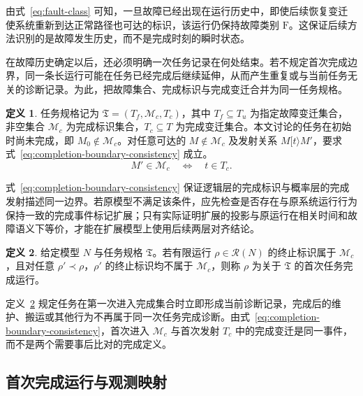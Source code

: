 \documentclass[master,fontset=ubuntu]{shnuthesis}
\theoremstyle{definition}
\newtheorem{thesisdefinition}{定义}
\begin{document}
由式~\eqref{eq:fault-class} 可知，一旦故障已经出现在运行历史中，即使后续恢复变迁使系统重新到达正常路径也可达的标识，该运行仍保持故障类别 \(\mathrm F\)。这保证后续方法识别的是故障发生历史，而不是完成时刻的瞬时状态。

在故障历史确定以后，还必须明确一次任务记录在何处结束。若不规定首次完成边界，同一条长运行可能在任务已经完成后继续延伸，从而产生重复或与当前任务无关的诊断记录。为此，把故障集合、完成标识与完成变迁合并为同一任务规格。

\begin{thesisdefinition}
\label{def:task-specification}
任务规格记为 \(\mathfrak T=(T_f,\mathcal M_c,T_c)\)，其中 \(T_f\subseteq T_u\) 为指定故障变迁集合，非空集合 \(\mathcal M_c\) 为完成标识集合，\(T_c\subseteq T\) 为完成变迁集合。本文讨论的任务在初始时尚未完成，即 \(M_0\notin\mathcal M_c\)。对任意可达的 \(M\notin\mathcal M_c\) 及发射关系 \(M[t\rangle M'\)，要求式~\eqref{eq:completion-boundary-consistency} 成立。
\begin{equation}
M'\in\mathcal M_c
\quad\Longleftrightarrow\quad
t\in T_c.
\label{eq:completion-boundary-consistency}
\end{equation}
\end{thesisdefinition}

式~\eqref{eq:completion-boundary-consistency} 保证逻辑层的完成标识与概率层的完成发射描述同一边界。若原模型不满足该条件，应先检查是否存在与原系统运行行为保持一致的完成事件标记扩展；只有实际证明扩展的投影与原运行在相关时间和故障语义下等价，才能在扩展模型上使用后续两层对齐结论。

\begin{thesisdefinition}
\label{def:first-completion}
给定模型 \(N\) 与任务规格 \(\mathfrak T\)。若有限运行 \(\rho\in\mathcal R(N)\) 的终止标识属于 \(\mathcal M_c\)，且对任意 \(\rho'\prec\rho\)，\(\rho'\) 的终止标识均不属于 \(\mathcal M_c\)，则称 \(\rho\) 为关于 \(\mathfrak T\) 的首次任务完成运行。
\end{thesisdefinition}

定义~\ref{def:first-completion} 规定任务在第一次进入完成集合时立即形成当前诊断记录，完成后的维护、搬运或其他行为不再属于同一次任务完成诊断。由式~\eqref{eq:completion-boundary-consistency}，首次进入 \(\mathcal M_c\) 与首次发射 \(T_c\) 中的完成变迁是同一事件，而不是两个需要事后比对的完成定义。

\subsection{首次完成运行与观测映射}
\end{document}
